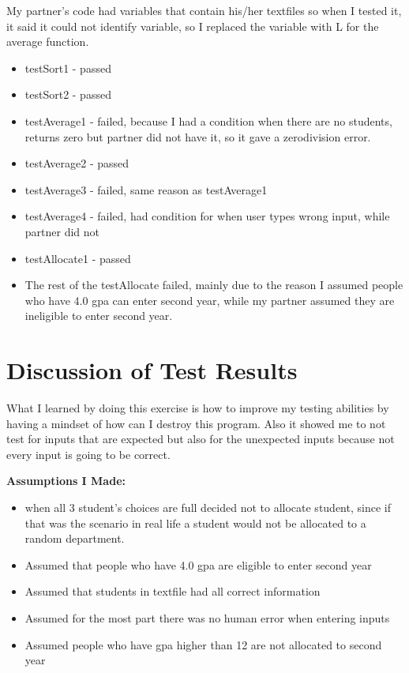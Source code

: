 \documentclass[12pt]{article}
\begin{document}
My partner's code had variables that contain his/her textfiles so when I tested it, it said it could not identify variable, so I replaced the variable with L for the average function.
\begin{itemize}
\item testSort1 - passed
\item testSort2 - passed
\item testAverage1 - failed, because I had a condition when there are no students, returns zero but partner did not have it, so it gave a zerodivision error.
\item testAverage2 - passed
\item testAverage3 - failed, same reason as testAverage1 
\item testAverage4 - failed, had condition for when user types wrong input, while partner did not
\item testAllocate1 - passed
\item The rest of the testAllocate failed, mainly due to the reason I assumed people who have 4.0 gpa can enter second year, while my partner assumed they are ineligible to enter second year.
\end{itemize}

\section{Discussion of Test Results}

What I learned by doing this exercise is how to improve my testing abilities by having a mindset of how can I destroy this program. Also it showed me to not test for inputs that are expected but also for the unexpected inputs because not every input is going to be correct.

\textbf{Assumptions I Made:}
\begin{itemize}
  \item when all 3 student's choices are full decided not to allocate student, since if that was the scenario in real life a student would not be allocated to a random department.
  \item Assumed that people who have 4.0 gpa are eligible to enter second year
  \item Assumed that students in textfile had all correct information
  \item Assumed for the most part there was no human error when entering inputs
  \item Assumed people who have gpa higher than 12 are not allocated to second year

\end{itemize}
\end{document}
